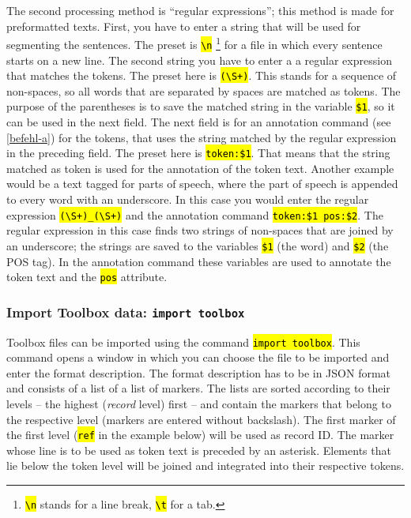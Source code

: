 \documentclass[12pt]{scrartcl}
\newcommand{\code}[1]{\hl{\texttt{#1}}}
\begin{document}
The second processing method is “regular expressions”; this method is made for preformatted texts.
First, you have to enter a string that will be used for segmenting the sentences.
The preset is \code{{\textbackslash}n} \footnote{\code{{\textbackslash}n} stands for a line break, \code{{\textbackslash}t} for a tab.} for a file in which every sentence starts on a new line.
The second string you have to enter a a regular expression that matches the tokens.
The preset here is \code{({\textbackslash}S+)}.
This stands for a sequence of non-spaces, so all words that are separated by spaces are matched as tokens.
The purpose of the parentheses is to save the matched string in the variable \code{\$1}, so it can be used in the next field.
The next field is for an annotation command (see \ref{befehl-a}) for the tokens, that uses the string matched by the regular expression in the preceding field.
The preset here is \code{token:\$1}.
That means that the string matched as token is used for the annotation of the token text.
Another example would be a text tagged for parts of speech, where the part of speech is appended to every word with an underscore.
In this case you would enter the regular expression \code{({\textbackslash}S+)\_({\textbackslash}S+)} and the annotation command \code{token:\$1 pos:\$2}.
The regular expression in this case finds two strings of non-spaces that are joined by an underscore; the strings are saved to the variables \code{\$1} (the word) and \code{\$2} (the POS tag).
In the annotation command these variables are used to annotate the token text and the \code{pos} attribute.


\subsubsection{Import Toolbox data: \texttt{import toolbox}}

Toolbox files can be imported using the command \code{import toolbox}.
This command opens a window in which you can choose the file to be imported and enter the format description.
The format description has to be in JSON format and consists of a list of a list of markers.
The lists are sorted according to their levels – the highest (\textit{record} level) first – and contain the markers that belong to the respective level (markers are entered without backslash).
The first marker of the first level (\code{ref} in the example below) will be used as record ID.
The marker whose line is to be used as token text is preceded by an asterisk.
Elements that lie below the token level will be joined and integrated into their respective tokens.
\end{document}
